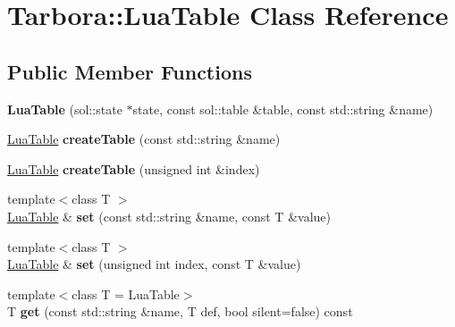 \hypertarget{classTarbora_1_1LuaTable}{}\section{Tarbora\+:\+:Lua\+Table Class Reference}
\label{classTarbora_1_1LuaTable}
\subsection*{Public Member Functions}
\begin{DoxyCompactItemize}
\item 
\mbox{\label{classTarbora_1_1LuaTable_a508b4529449f2f8c8ed976a1ef1bc8b9}} 
{\bfseries Lua\+Table} (sol\+::state $\ast$state, const sol\+::table \&table, const std\+::string \&name)
\item 
\mbox{\label{classTarbora_1_1LuaTable_a7638247cb398732d3903281b7376e6d4}} 
\hyperlink{classTarbora_1_1LuaTable}{Lua\+Table} {\bfseries create\+Table} (const std\+::string \&name)
\item 
\mbox{\label{classTarbora_1_1LuaTable_a0b7336dc8adaa3bb6c612d9016d1b819}} 
\hyperlink{classTarbora_1_1LuaTable}{Lua\+Table} {\bfseries create\+Table} (unsigned int \&index)
\item 
\mbox{\label{classTarbora_1_1LuaTable_ae29b708a1e279d01907d00e345427d29}} 
{\footnotesize template$<$class T $>$ }\\\hyperlink{classTarbora_1_1LuaTable}{Lua\+Table} \& {\bfseries set} (const std\+::string \&name, const T \&value)
\item 
\mbox{\label{classTarbora_1_1LuaTable_a53e1aeabdbe8c4dbda146a6b7cf00ae6}} 
{\footnotesize template$<$class T $>$ }\\\hyperlink{classTarbora_1_1LuaTable}{Lua\+Table} \& {\bfseries set} (unsigned int index, const T \&value)
\item 
\mbox{\label{classTarbora_1_1LuaTable_a819ba7315f8ab6263f1a1a8ecca32f06}} 
{\footnotesize template$<$class T  = Lua\+Table$>$ }\\T {\bfseries get} (const std\+::string \&name, T def, bool silent=false) const

\end{DoxyCompactItemize}
